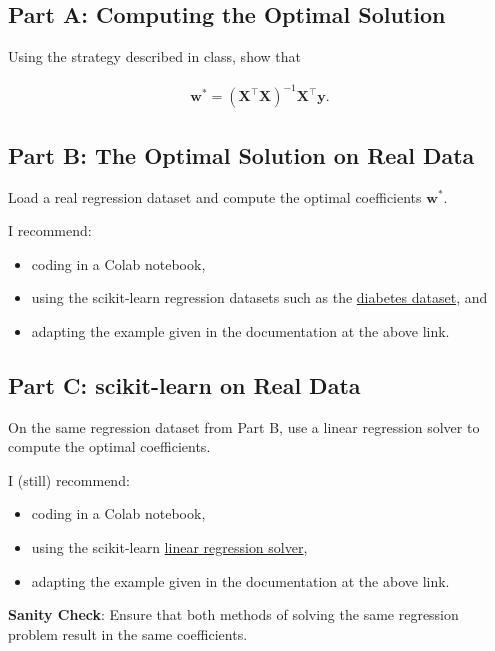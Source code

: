 \documentclass{article}
\begin{document}
\subsection*{Part A: Computing the Optimal Solution}

Using the strategy described in class, show that

\begin{align}
    \mathbf{w}^* = (\mathbf{X^\top X})^{-1} \mathbf{X^\top y}.
\end{align}


\subsection*{Part B: The Optimal Solution on Real Data}

Load a real regression dataset and compute the optimal coefficients $\mathbf{w}^*$.

I recommend:
\begin{itemize}
    \item coding in a Colab notebook,
    \item using the scikit-learn regression datasets such as the \href{https://scikit-learn.org/1.5/modules/generated/sklearn.datasets.load_diabetes.html#sklearn.datasets.load_diabetes}{diabetes dataset}, and
    \item adapting the example given in the documentation at the above link.
\end{itemize}

\subsection*{Part C: scikit-learn on Real Data}

On the same regression dataset from Part B, use a linear regression solver to compute the optimal coefficients.

I (still) recommend:
\begin{itemize}
    \item coding in a Colab notebook,
    \item using the scikit-learn \href{https://scikit-learn.org/1.5/modules/generated/sklearn.linear_model.LinearRegression.html}{linear regression solver},
    \item adapting the example given in the documentation at the above link.
\end{itemize}

\noindent
\textbf{Sanity Check}: Ensure that both methods of solving the same regression problem result in the same coefficients.
\end{document}
